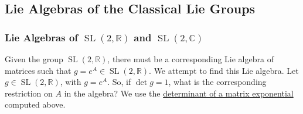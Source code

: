 \documentclass{article}
\DeclareMathOperator{\SL}{SL}
\begin{document}
  \subsection{Lie Algebras of the Classical Lie Groups}

  \subsubsection[Lie Algebras of SL(2, R) and SL(2, C)]{Lie Algebras of $\SL(2, \mathbb{R})$ and $\SL(2, \mathbb{C})$}
    \label{sec:lie-algebra-sl2}

    Given the group $\SL(2, \mathbb{R})$, there must be a corresponding Lie algebra of matrices such that $g = e^A \in \SL(2, \mathbb{R})$. We attempt to find this Lie algebra. Let $g \in \SL(2, \mathbb{R})$, with $g = e^A$. So, if $\det{g} = 1$, what is the corresponding restriction on $A$ in the algebra? We use the \hyperref[thm:determinant-of-a-matrix-exponential]{determinant of a matrix exponential} computed above. 
\end{document}
